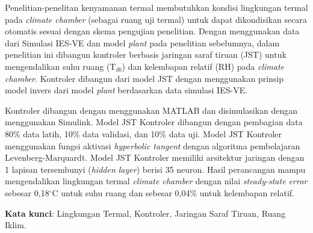 Penelitian-penelitan kenyamanan termal membutuhkan kondisi lingkungan termal pada \textit{climate chamber} (sebagai ruang uji termal) untuk dapat dikondisikan secara otomatis sesuai dengan skema pengujian penelitian. Dengan menggunakan data dari Simulasi IES-VE \cite{skripsiIchfan} dan model \textit{plant} \cite{skripsiTanto} pada penelitian sebelumnya, dalam penelitian ini dibangun kontroler berbasis jaringan saraf tiruan (JST) untuk mengendalikan suhu ruang (T$_{db}$) dan kelembapan relatif (RH) pada \textit{climate chamber}. Kontroler dibangun dari model JST dengan menggunakan prinsip model invers dari model \textit{plant} berdasarkan data simulasi IES-VE.

Kontroler dibangun dengan menggunakan MATLAB dan disimulasikan dengan menggunakan Simulink. Model JST Kontroler dibangun dengan pembagian data 80\% data latih, 10\% data validasi, dan 10\% data uji. Model JST Kontroler menggunakan fungsi aktivasi \textit{hyperbolic tangent} dengan algoritma pembelajaran Levenberg-Marquardt. Model JST Kontroler memiliki arsitektur jaringan dengan 1 lapisan tersembunyi (\textit{hidden layer}) berisi 35 neuron. Hasil perancangan mampu mengendalikan lingkungan termal \textit{climate chamber} dengan nilai \textit{steady-state error} sebesar 0,18$^\circ$C untuk suhu ruang dan sebesar 0,04\% untuk kelembapan relatif.

\vspace{0.5cm}
\hspace{-1.2cm}
\textbf{Kata kunci}: Lingkungan Termal, Kontroler, Jaringan Saraf Tiruan, Ruang Iklim.


